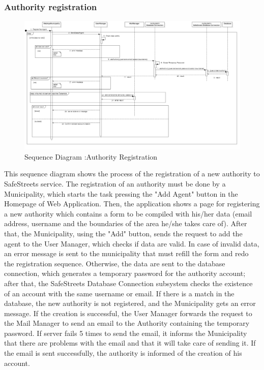 \subsubsection{Authority registration}
\begin{figure}[H]
\centering
\includegraphics[width=\textwidth]{Images/SequenceAuthorityRegistration.png}
\caption{\label{fig:ComWI}Sequence Diagram :Authority Registration}
\end{figure}
This sequence diagram shows the process of the registration of a new authority to SafeStreets service.
The registration of an authority must be done by a Municipality, which starts the task pressing the "Add Agent" button in the Homepage of Web Application. Then, the application shows a page for registering a new authority which contains a form to be compiled with his/her data (email address, username and the boundaries of the area he/she takes care of). After that, the Municipality, using the "Add" button, sends the request to add the agent to the User Manager, which checks if data are valid. In case of invalid data, an error message is sent to the municipality that must refill the form and redo the registration sequence. Otherwise, the data are sent to the database connection, which generates a temporary password for the authority account; after that, the SafeStreets Database Connection subsystem checks the existence of an account with the same username or email. If there is a match in the database, the new authority is not registered, and the Municipality gets an error message. If the creation is successful, the User Manager forwards the request to the Mail Manager to send an email to the Authority containing the temporary password. If server fails 5 times to send the email, it informs the Municipality that there are problems with the email and that it will take care of sending it. If the email is sent successfully, the authority is informed of the creation of his account.

